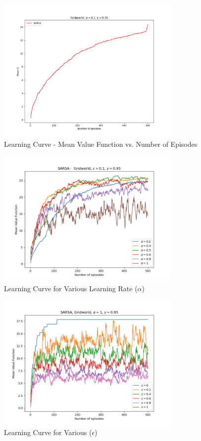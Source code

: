 \documentclass[conference]{IEEEtran}
\begin{document}
\begin{figure}[!htbp]
\centerline{\includegraphics[width=3.5in]{g_sarsa_learning_curve}}
\caption{Learning Curve - Mean Value Function vs. Number of Episodes}
\label{fig}
\end{figure}
\FloatBarrier

\begin{figure}[!htbp]
\centerline{\includegraphics[width=3.5in]{g_sarsa_learning_curves_alpha}}
\caption{Learning Curve for Various Learning Rate ($\alpha$)}
\label{fig}
\end{figure}
\FloatBarrier

\begin{figure}[!htbp]
\centerline{\includegraphics[width=3.5in]{g_sarsa_learning_curves_epsilon}}
\caption{Learning Curve for Various ($\epsilon$)}
\label{fig}
\end{figure}
\FloatBarrier
\end{document}
